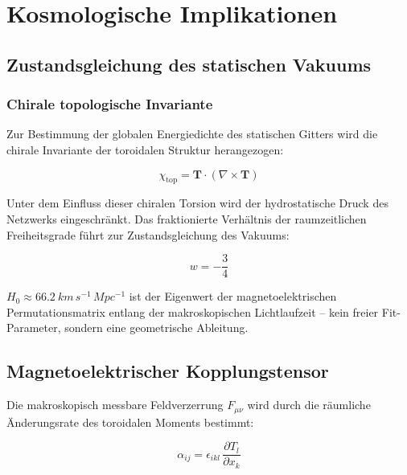 \chapter{Kosmologische Implikationen}

\section{Zustandsgleichung des statischen Vakuums}

\subsection{Chirale topologische Invariante}

Zur Bestimmung der globalen Energiedichte des statischen Gitters wird die
chirale Invariante der toroidalen Struktur herangezogen:

\begin{equation}
  \chi_{\mathrm{top}} = \mathbf{T} \cdot (\nabla \times \mathbf{T})
  \label{eq:chiral-invariant}
\end{equation}

Unter dem Einfluss dieser chiralen Torsion wird der hydrostatische Druck
des Netzwerks eingeschränkt. Das fraktionierte Verhältnis der raumzeitlichen
Freiheitsgrade führt zur Zustandsgleichung des Vakuums:

\begin{equation}
  w = -\frac{3}{4}
  \label{eq:eos-ffgft}
\end{equation}

\begin{keypoint}
$H_0 \approx \SI{66.2}{km\,s^{-1}\,Mpc^{-1}}$ ist der Eigenwert der
magnetoelektrischen Permutationsmatrix entlang der makroskopischen Lichtlaufzeit --
kein freier Fit-Parameter, sondern eine geometrische Ableitung.
\end{keypoint}

\section{Magnetoelektrischer Kopplungstensor}

Die makroskopisch messbare Feldverzerrung $F_{\mu\nu}$ wird durch die
räumliche Änderungsrate des toroidalen Moments bestimmt:

\begin{equation}
  \alpha_{ij} = \epsilon_{ikl}\,\frac{\partial T_l}{\partial x_k}
  \label{eq:ME-tensor}
\end{equation}

